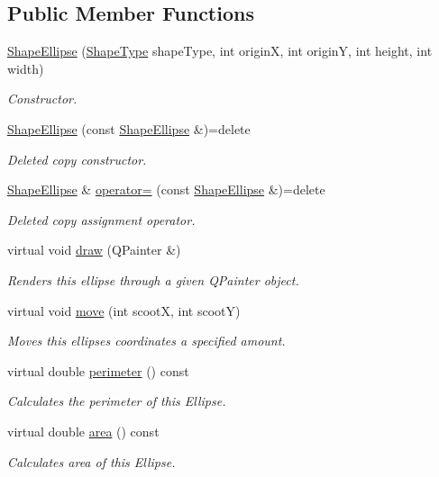 \subsection*{Public Member Functions}
\begin{DoxyCompactItemize}
\item 
\mbox{\hyperlink{class_shape_ellipse_a80f7ee6f65112d606b348d89366feeee}{Shape\+Ellipse}} (\mbox{\hyperlink{class_i_shape_a8f50993477b5ddb44c0547ef3d547cdc}{Shape\+Type}} shape\+Type, int originX, int originY, int height, int width)
\begin{DoxyCompactList}\small\item\em Constructor. \end{DoxyCompactList}\item 
\mbox{\hyperlink{class_shape_ellipse_a681b89e97838504d2c7f6c1771055b2e}{Shape\+Ellipse}} (const \mbox{\hyperlink{class_shape_ellipse}{Shape\+Ellipse}} \&)=delete
\begin{DoxyCompactList}\small\item\em Deleted copy constructor. \end{DoxyCompactList}\item 
\mbox{\hyperlink{class_shape_ellipse}{Shape\+Ellipse}} \& \mbox{\hyperlink{class_shape_ellipse_ad9859459d9f53eac418601c054cf3289}{operator=}} (const \mbox{\hyperlink{class_shape_ellipse}{Shape\+Ellipse}} \&)=delete
\begin{DoxyCompactList}\small\item\em Deleted copy assignment operator. \end{DoxyCompactList}\item 
virtual void \mbox{\hyperlink{class_shape_ellipse_ac7f0a33cb5a88c6956f2d876c0c5d313}{draw}} (Q\+Painter \&)
\begin{DoxyCompactList}\small\item\em Renders this ellipse through a given Q\+Painter object. \end{DoxyCompactList}\item 
virtual void \mbox{\hyperlink{class_shape_ellipse_a07ce6783744d01ccebbd5c2c8b4c7d9b}{move}} (int scootX, int scootY)
\begin{DoxyCompactList}\small\item\em Moves this ellipse\textquotesingle{}s coordinates a specified amount. \end{DoxyCompactList}\item 
virtual double \mbox{\hyperlink{class_shape_ellipse_a397c01c912105854e065f6c2d766f73a}{perimeter}} () const
\begin{DoxyCompactList}\small\item\em Calculates the perimeter of this Ellipse. \end{DoxyCompactList}\item 
virtual double \mbox{\hyperlink{class_shape_ellipse_a08287b301b7501eb941805eaf85fc00c}{area}} () const
\begin{DoxyCompactList}\small\item\em Calculates area of this Ellipse. \end{DoxyCompactList}\end{DoxyCompactItemize}
